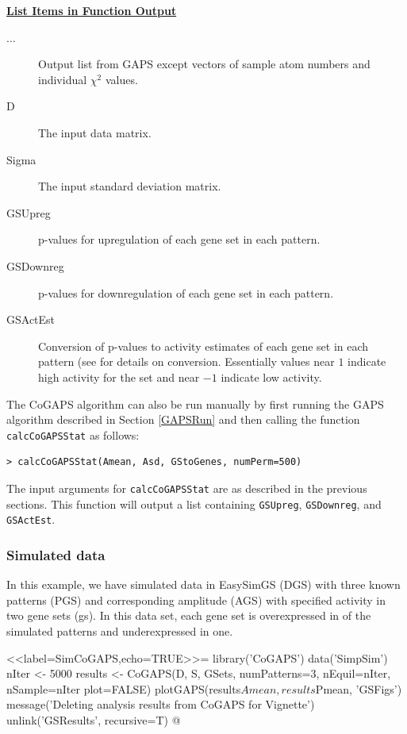 \documentclass{report}
\begin{document}
\par \noindent \textbf{\underline{List Items in Function Output}}
\begin{description}
\item[$\ldots$]{Output list from GAPS except vectors of sample atom numbers and individual $\chi^2$ values.}
\item[D]{The input data matrix.}
\item[Sigma]{The input standard deviation matrix.}
\item[GSUpreg]{p-values for upregulation of each gene set in each pattern.}
\item[GSDownreg]{p-values for downregulation of each gene set in each pattern.}
\item[GSActEst]{Conversion of p-values to activity estimates of each gene set in each pattern (see \cite{Ochs2009} for details on conversion.  Essentially values near $1$ indicate high activity for the set and near $-1$ indicate low activity.}
\end{description}

\par The CoGAPS algorithm can also be run manually by first running the GAPS algorithm described in Section \ref{GAPSRun} and then calling the function \texttt{calcCoGAPSStat} as follows:
\begin{verbatim}
> calcCoGAPSStat(Amean, Asd, GStoGenes, numPerm=500)
\end{verbatim}
The input arguments for \texttt{calcCoGAPSStat} are as described in the previous sections.  This function will output a list containing \texttt{GSUpreg}, \texttt{GSDownreg}, and \texttt{GSActEst}.

\subsubsection{Simulated data}

\par In this example, we have simulated data in EasySimGS (DGS) with three known patterns (PGS) and corresponding amplitude (AGS) with specified activity in two gene sets (gs).  In this data set, each gene set is overexpressed in of the simulated patterns and underexpressed in one.

<<label=SimCoGAPS,echo=TRUE>>=
library('CoGAPS')
data('SimpSim')
nIter <- 5000 
results <- CoGAPS(D, S, GSets,
                  numPatterns=3,
                  nEquil=nIter, nSample=nIter
                  plot=FALSE)
plotGAPS(results$Amean, results$Pmean, 'GSFigs')
message('Deleting analysis results from CoGAPS for Vignette')
unlink('GSResults', recursive=T)
@
\end{document}
